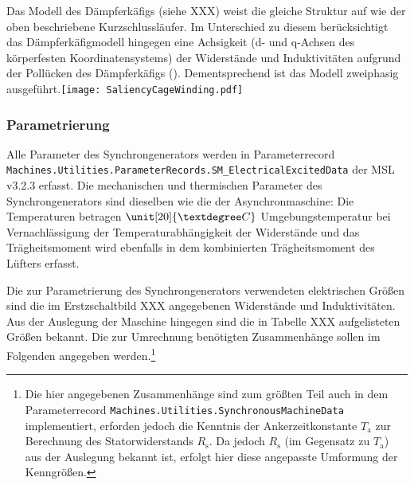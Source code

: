 Das Modell des Dämpferkäfigs (siehe XXX) weist die gleiche Struktur auf
wie der oben beschriebene Kurzschlussläufer. Im Unterschied zu diesem
berücksichtigt das Dämpferkäfigmodell hingegen eine Achsigkeit (d- und
q-Achsen des körperfesten Koordinatensystems) der Widerstände und
Induktivitäten aufgrund der Pollücken des Dämpferkäfigs
(\cite[S. 194]{kralModelicaObjektorientierteModellbildung2019}).
Dementsprechend ist das Modell zweiphasig
ausgeführt.\texttt{[image: SaliencyCageWinding.pdf]}

\hypertarget{parametrierung-1}{%
\subsubsection{Parametrierung}\label{parametrierung-1}}

Alle Parameter des Synchrongenerators werden in Parameterrecord
\texttt{Machines.Utilities.ParameterRecords.SM\_ElectricalExcitedData}
der MSL v3.2.3 erfasst. Die mechanischen und thermischen Parameter des
Synchrongenerators sind dieselben wie die der Asynchronmaschine: Die
Temperaturen betragen \(\unit[20]{°C}\) Umgebungstemperatur bei
Vernachlässigung der Temperaturabhängigkeit der Widerstände und das
Trägheitsmoment wird ebenfalls in dem kombinierten Trägheitsmoment des
Lüfters erfasst.

Die zur Parametrierung des Synchrongenerators verwendeten elektrischen
Größen sind die im Erstzschaltbild XXX angegebenen Widerstände und
Induktivitäten. Aus der Auslegung der Maschine hingegen sind die in
Tabelle XXX aufgelisteten Größen bekannt. Die zur Umrechnung benötigten
Zusammenhänge sollen im Folgenden angegeben werden.\footnote{Die hier
  angegebenen Zusammenhänge sind zum größten Teil auch in dem
  Parameterrecord \texttt{Machines.Utilities.SynchronousMachineData}
  implementiert, erforden jedoch die Kenntnis der Ankerzeitkonstante
  \(T_{\mathrm{a}}\) zur Berechnung des Statorwiderstands
  \(R_{\mathrm{s}}\). Da jedoch \(R_{\mathrm{s}}\) (im Gegensatz zu
  \(T_{\mathrm{a}}\)) aus der Auslegung bekannt ist, erfolgt hier diese
  angepasste Umformung der Kenngrößen.}

